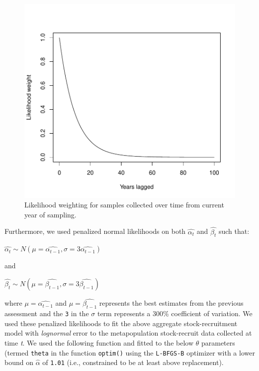 \documentclass[]{article}
\begin{document}
\begin{figure}[H]

{\centering \includegraphics{Managing_for_ecological_surprises_in_metapopulations_makeHTML_files/figure-latex/unnamed-chunk-1-1} 

}

\caption{Likelihood weighting for samples collected over time from current year of sampling.}\label{fig:unnamed-chunk-1}
\end{figure}

Furthermore, we used penalized normal likelihoods on both
\(\hat{\alpha_t}\) and \(\hat{\beta_t}\) such that:

\(\hat{\alpha_t} \sim N(\mu=\hat{\alpha_{t-1}},\sigma=3\hat{\alpha_{t-1}})\)

and

\(\hat{\beta_t} \sim N(\mu=\hat{\beta_{t-1}},\sigma=3\hat{\beta_{t-1}})\)

where \(\mu=\hat{\alpha_{t-1}}\) and \(\mu=\hat{\beta_{t-1}}\)
represents the best estimates from the previous assessment and the
\texttt{3} in the \(\sigma\) term represents a 300\% coefficient of
variation. We used these penalized likelihoods to fit the above
aggregate stock-recruitment model with \emph{lognormal} error to the
metapopulation stock-recruit data collected at time \emph{t}. We used
the following function and fitted to the below \(\theta\) parameters
(termed \texttt{theta} in the function \texttt{optim()} using the
\texttt{L-BFGS-B} optimizer with a lower bound on \(\hat{\alpha}\) of
\texttt{1.01} (i.e., constrained to be at least above replacement).
\end{document}
